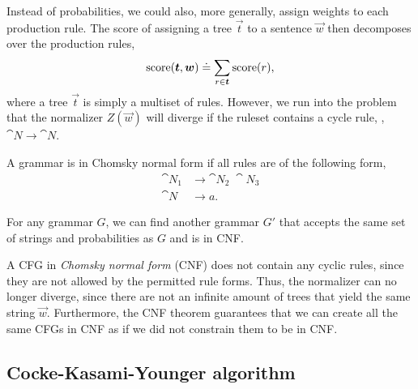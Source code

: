 Instead of probabilities, we could also, more generally, assign weights to each
production rule. The score of assigning a tree $\vec{t}$ to a sentence
$\vec{w}$ then decomposes over the production rules, \[
  \mathrm{score}(\bm{t},\bm{w}) \doteq \sum_{r\in\bm{t}} \mathrm{score}(r)
,\]
where a tree $\vec{t}$ is simply a multiset of rules. However, we run into the
problem that the normalizer $Z(\vec{w})$ will diverge if the ruleset contains a
cycle rule, \eg, $\cat{N}\to\cat{N}$.

\begin{definition}
  A grammar is in Chomsky normal form if all rules are of the following form,
  \begin{align*}
    \cat{N}_1 &\to \cat{N}_2 \; \cat{N}_3 \\
    \cat{N} &\to a
  .\end{align*}
\end{definition}

\begin{theorem}
  For any grammar $G$, we can find another grammar $G'$ that accepts the same
  set of strings and probabilities as $G$ and is in CNF.
\end{theorem}

A CFG in \textit{Chomsky normal form} (CNF) does not contain any cyclic rules,
since they are not allowed by the permitted rule forms. Thus, the normalizer
can no longer diverge, since there are not an infinite amount of trees that
yield the same string $\vec{w}$. Furthermore, the CNF theorem guarantees that
we can create all the same CFGs in CNF as if we did not constrain them to be in
CNF.

\subsection{Cocke-Kasami-Younger algorithm}

